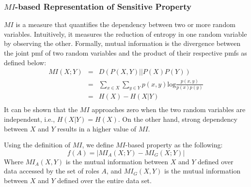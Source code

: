 \subsubsection{$MI$-based Representation of Sensitive Property}
$MI$ is a measure that quantifies the dependency between two or more random variables. Intuitively, it measures the reduction of entropy in one random variable by observing the other. Formally, mutual information is the divergence between the joint pmf of two random variables and the product of their respective pmfs as defined below:
\begin{eqnarray*}\label{eq:mi}
MI(X;Y) &= &D(P(X,Y)||P(X)P(Y))\\
&=& \sum_{x \in X}\sum_{y \in Y} p(x,y) \text{log}\frac{p(x,y)}{p(x)p(y)}\\
& = & H(X) - H(X|Y)\\	
\end{eqnarray*}
It can be shown that the $MI$ approaches zero when the two random variables are independent, i.e., $H(X|Y) = H(X)$. On the other hand, strong dependency between $X$ and $Y$ results in a higher value of $MI$. 

Using the definition of $MI$, we define $MI$-based property as the following:
\begin{equation}
f(A) = |MI_A(X;Y) - MI_G(X;Y)|
\label{eq:f_mi}
\end{equation}
Where $MI_A(X,Y)$ is the mutual information between $X$ and $Y$ defined over data accessed by the set of roles $A$, and $MI_G(X,Y)$ is the mutual information between $X$ and $Y$ defined over the entire data set.


%
%
%
%





